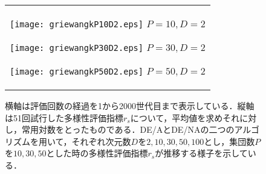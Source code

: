 \documentclass[a4paper,11pt,oneside,openany]{jsbook}
\begin{document}
\newpage
\begin{figure}[htbp]
  \caption{横軸は評価回数の経過を1から2000世代目まで表示している．縦軸は51回試行した多様性評価指標$r_s$について，平均値を求めそれに対し，常用対数をとったものである．DE/AとDE/NAの二つのアルゴリズムを用いて，それぞれ次元数$D$を$2,10,30,50,100$とし，集団数$P$を$10,30,50$とした時の多様性評価指標$r_s$が推移する様子を示している．}
  \begin{center}
    \begin{tabular}{c}
      \begin{minipage}{0.33\hsize}
        \begin{center}
          \texttt{[image: griewangkP10D2.eps]}
          \hspace{1.2cm}$P=10, D=2
 $       \end{center}
      \end{minipage}

      \begin{minipage}{0.33\hsize}
        \begin{center}
          \texttt{[image: griewangkP30D2.eps]}
          \hspace{1.2cm}$P=30, D=2
 $       \end{center}
      \end{minipage}

      \begin{minipage}{0.33\hsize}
        \begin{center}
          \texttt{[image: griewangkP50D2.eps]}
          \hspace{1.2cm}$P=50, D=2
 $       \end{center}
      \end{minipage}
    \end{tabular}
  \end{center}
\end{figure}
\end{document}
